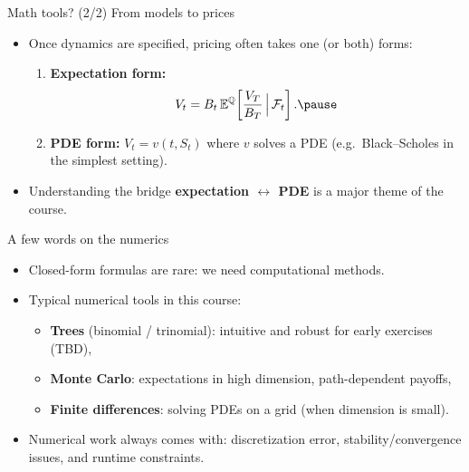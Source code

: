 \documentclass[10pt,aspectratio=169]{beamer}
\begin{document}
\begin{frame}{Math tools? (2/2) From models to prices}
\begin{itemize}
  \item Once dynamics are specified, pricing often takes one (or both) forms:\pause 
  \begin{enumerate}
    \item \textbf{Expectation form:}
    \[
    V_t = B_t \, \mathbb{E}^{\mathbb{Q}}\!\left[\frac{V_T}{B_T}\,\Big|\,\mathcal{F}_t\right].\pause 
    \]
    \item \textbf{PDE form:} $V_t=v(t,S_t)$ where $v$ solves a PDE (e.g.\ Black--Scholes in the simplest setting).\pause 
  \end{enumerate}
  \item Understanding the bridge \textbf{expectation $\leftrightarrow$ PDE} is a major theme of the course. 
\end{itemize}
\end{frame}

\begin{frame}{A few words on the numerics}
\begin{itemize}
  \item Closed-form formulas are rare: we need computational methods.\pause 
  \item Typical numerical tools in this course:
  \begin{itemize}
    \item \textbf{Trees} (binomial / trinomial): intuitive and robust for early exercises (TBD),\pause
    \item \textbf{Monte Carlo}: expectations in high dimension, path-dependent payoffs,\pause 
    \item \textbf{Finite differences}: solving PDEs on a grid (when dimension is small).\pause 
  \end{itemize}
  \item Numerical work always comes with:
  discretization error, stability/convergence issues, and runtime constraints.
\end{itemize}
\end{frame}
\end{document}
